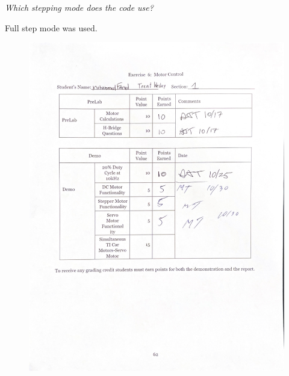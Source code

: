 \documentclass[CMPE]{KGCOEReport}
\begin{document}
\bigskip

\emph{Which stepping mode does the code use?}

Full step mode was used.\\

\newpage
\begin{figure}[H]
    \centering
    \begin{adjustbox}{center}
        \includegraphics[width=1.26\textwidth]{signoff.pdf}
    \end{adjustbox}
\end{figure}
\end{document}
